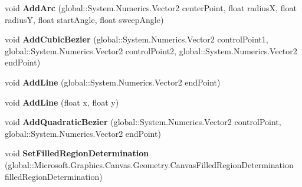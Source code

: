 \begin{DoxyCompactItemize}
\item 
\mbox{\label{class_microsoft_1_1_graphics_1_1_canvas_1_1_geometry_1_1_canvas_path_builder_a5bc022c0799cfd3c392f412fc76aeb53}} 
void {\bfseries Add\+Arc} (global\+::\+System.\+Numerics.\+Vector2 center\+Point, float radiusX, float radiusY, float start\+Angle, float sweep\+Angle)
\item 
\mbox{\label{class_microsoft_1_1_graphics_1_1_canvas_1_1_geometry_1_1_canvas_path_builder_a192b933b8c38dcc6fd799668ab3a2e96}} 
void {\bfseries Add\+Cubic\+Bezier} (global\+::\+System.\+Numerics.\+Vector2 control\+Point1, global\+::\+System.\+Numerics.\+Vector2 control\+Point2, global\+::\+System.\+Numerics.\+Vector2 end\+Point)
\item 
\mbox{\label{class_microsoft_1_1_graphics_1_1_canvas_1_1_geometry_1_1_canvas_path_builder_a977ac73b78685510b323dc0f9f9d92a2}} 
void {\bfseries Add\+Line} (global\+::\+System.\+Numerics.\+Vector2 end\+Point)
\item 
\mbox{\label{class_microsoft_1_1_graphics_1_1_canvas_1_1_geometry_1_1_canvas_path_builder_ab36909f8900a9d581be0045841b600a6}} 
void {\bfseries Add\+Line} (float x, float y)
\item 
\mbox{\label{class_microsoft_1_1_graphics_1_1_canvas_1_1_geometry_1_1_canvas_path_builder_a2cf174a6a37788207d5f4464513863e4}} 
void {\bfseries Add\+Quadratic\+Bezier} (global\+::\+System.\+Numerics.\+Vector2 control\+Point, global\+::\+System.\+Numerics.\+Vector2 end\+Point)
\item 
\mbox{\label{class_microsoft_1_1_graphics_1_1_canvas_1_1_geometry_1_1_canvas_path_builder_a933ad60d19366b2851e3ad2a78ce363c}} 
void {\bfseries Set\+Filled\+Region\+Determination} (global\+::\+Microsoft.\+Graphics.\+Canvas.\+Geometry.\+Canvas\+Filled\+Region\+Determination filled\+Region\+Determination)
\item 

\end{DoxyCompactItemize}
